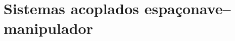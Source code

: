 


\section{Sistemas acoplados espaçonave--manipulador} %
\label{sec_modelagem_controle_espaconave_manipulador}

